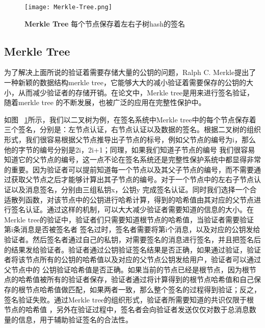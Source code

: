 \begin{figure}[!htp]
    \centering
    \texttt{[image: Merkle-Tree.png]}
    \caption{\textbf{Merkle Tree }每个节点保存着左右子树hash的签名}
   \label{fig:Merkle-Tree.png}
\end{figure}
\subsection{Merkle Tree}
为了解决上面所说的验证着需要存储大量的公钥的问题，Ralph C. Merkle提出了一种新颖的数据结构merkle tree，它能够大大的减小验证着需要保存的公钥的大小，从而减少验证者的存储开销。在论文中，Merkle tree是用来进行签名验证，随着merkle tree
的不断发展，也被广泛的应用在完整性保护中。

如图 ~\ref{fig:Merkle-Tree.png}所示，我们以二叉树为例，在签名系统中Merkle tree中的每个节点保存着三个签名，分别是：左节点认证，右节点认证以及数据的签名。根据二叉树的组织形式，我们很容易根据父节点推导出子节点的标号，例如父节点的编号为i，那么他的字节的编号分别是2i，2i+1；同理，如果我们知道子节点的编号
我们很容易知道它的父节点的编号，这一点不论在签名系统还是完整性保护系统中都显得非常的重要。因为验证者可以提前知道每一个节点以及其父子节点的编号，而不需要通过获取父节点之后才能够计算出其子节点的编号。对于一个节点中的左右子节点认证以及消息签名，分别由三组私钥x，公钥y
完成签名认证。同时我们选择一个合适散列函数，对该节点中的公钥进行哈希计算，得到的哈希值由其对应的父节点进行签名认证。通过这样的机制，可以大大减少验证者需要知道的信息的大小。在Merkle tree的验证中，验证者们只需要知道根节点的哈希值，当验证者需要验证第i条消息是否被签名者
签名过时，签名者需要将第i个消息，以及对应的公钥发给验证者。然后签名者通过自己的私钥，对需要签名的消息进行签名，并且把签名后的结果发给验证者。验证者通过公钥验证签名结果是否正确，如果通过验证，验证者将该节点所有的公钥的哈希值以及对应的父节点公钥发给用户，验证者可以通过父节点中的
公钥验证哈希值是否正确。如果当前的节点已经是根节点，因为根节点的哈希值被所有的验证者保存，验证者通过将计算得到的根节点哈希值和自己保存的根节点哈希值做匹配，如果两者一致，那么整个签名的过程得到验证；反之，签名验证失败。通过Merkle tree的组织形式，验证者所需要知道的共识仅限于根节点的哈希值
，另外在验证过程中，签名者会向验证者发送仅仅对数于总消息数量的信息，用于辅助验证签名的合法性。

